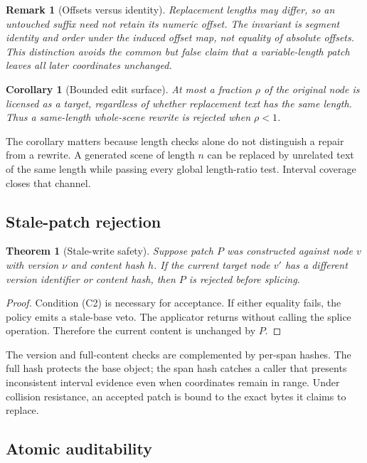 \documentclass[11pt]{article}
\newtheorem{theorem}[definition]{Theorem}
\newtheorem{corollary}[definition]{Corollary}
\newtheorem{remark}[definition]{Remark}
\begin{document}
\begin{remark}[Offsets versus identity]
Replacement lengths may differ, so an untouched suffix need not retain its numeric offset.
The invariant is segment identity and order under the induced offset map, not equality of
absolute offsets. This distinction avoids the common but false claim that a variable-length
patch leaves all later coordinates unchanged.
\end{remark}

\begin{corollary}[Bounded edit surface]
At most a fraction $\rho$ of the original node is licensed as a target, regardless of whether
replacement text has the same length. Thus a same-length whole-scene rewrite is rejected when
$\rho<1$.
\end{corollary}

The corollary matters because length checks alone do not distinguish a repair from a rewrite.
A generated scene of length $n$ can be replaced by unrelated text of the same length while
passing every global length-ratio test. Interval coverage closes that channel.

\subsection{Stale-patch rejection}

\begin{theorem}[Stale-write safety]
\label{thm:stale}
Suppose patch $P$ was constructed against node $v$ with version $\nu$ and content hash $h$.
If the current target node $v'$ has a different version identifier or content hash, then
$P$ is rejected before splicing.
\end{theorem}

\begin{proof}
Condition (C2) is necessary for acceptance. If either equality fails, the policy emits a
stale-base veto. The applicator returns without calling the splice operation. Therefore the
current content is unchanged by $P$.
\end{proof}

The version and full-content checks are complemented by per-span hashes. The full hash
protects the base object; the span hash catches a caller that presents inconsistent interval
evidence even when coordinates remain in range. Under collision resistance, an accepted
patch is bound to the exact bytes it claims to replace.

\subsection{Atomic auditability}
\end{document}
